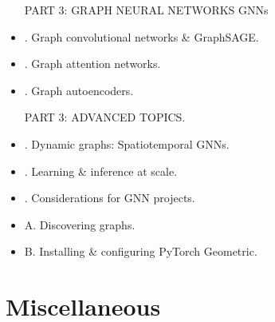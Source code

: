\documentclass{article}
\begin{document}
\begin{itemize}
    PART 3: GRAPH NEURAL NETWORKS GNNs
    \item {. Graph convolutional networks \& GraphSAGE.}
    \item {. Graph attention networks.}
    \item {. Graph autoencoders.}

    PART 3: ADVANCED TOPICS.
    \item {. Dynamic graphs: Spatiotemporal GNNs.}
    \item {. Learning \& inference at scale.}
    \item {. Considerations for GNN projects.}
    \item {\sf A. Discovering graphs.}
    \item {\sf B. Installing \& configuring PyTorch Geometric.}

\end{itemize}


\section{Miscellaneous}


\printbibliography[heading=bibintoc]
\end{document}
